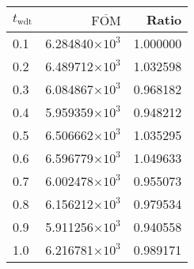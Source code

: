 \begin{tabular}{lrr}
\toprule
$t_{\mathrm{wdt}}$ & $\overline{\mathrm{FOM}}$ &    Ratio \\
\midrule
               0.1 &   6.284840$\times 10^{3}$ & 1.000000 \\
               0.2 &   6.489712$\times 10^{3}$ & 1.032598 \\
               0.3 &   6.084867$\times 10^{3}$ & 0.968182 \\
               0.4 &   5.959359$\times 10^{3}$ & 0.948212 \\
               0.5 &   6.506662$\times 10^{3}$ & 1.035295 \\
               0.6 &   6.596779$\times 10^{3}$ & 1.049633 \\
               0.7 &   6.002478$\times 10^{3}$ & 0.955073 \\
               0.8 &   6.156212$\times 10^{3}$ & 0.979534 \\
               0.9 &   5.911256$\times 10^{3}$ & 0.940558 \\
               1.0 &   6.216781$\times 10^{3}$ & 0.989171 \\
\bottomrule
\end{tabular}
